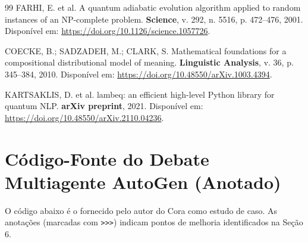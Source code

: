 \documentclass[5p]{elsarticle}
\theoremstyle{remark}
\begin{document}
\begin{thebibliography}{99}
FARHI, E. et al. A quantum adiabatic evolution algorithm applied to random instances of an NP-complete problem. \textbf{Science}, v. 292, n. 5516, p. 472--476, 2001. Disponível em: \url{https://doi.org/10.1126/science.1057726}.

COECKE, B.; SADZADEH, M.; CLARK, S. Mathematical foundations for a compositional distributional model of meaning. \textbf{Linguistic Analysis}, v. 36, p. 345--384, 2010. Disponível em: \url{https://doi.org/10.48550/arXiv.1003.4394}.

KARTSAKLIS, D. et al. lambeq: an efficient high-level Python library for quantum NLP. \textbf{arXiv preprint}, 2021. Disponível em: \url{https://doi.org/10.48550/arXiv.2110.04236}.

\end{thebibliography}

\appendix
\section{Código-Fonte do Debate Multiagente AutoGen (Anotado)}

O código abaixo é o fornecido pelo autor do Cora como estudo de caso. As anotações (marcadas com \texttt{>>>}) indicam pontos de melhoria identificados na Seção 6.
\end{document}
